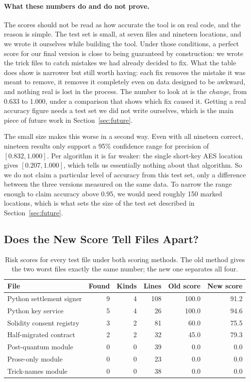\documentclass[runningheads]{llncs}
\begin{document}
\paragraph{What these numbers do and do not prove.} The scores should not be
read as how accurate the tool is on real code, and the reason is simple. The
test set is small, at seven files and nineteen locations, and we wrote it
ourselves while building the tool. Under those conditions, a perfect score for
our final version is close to being guaranteed by construction: we wrote the
trick files to catch mistakes we had already decided to fix. What the table does
show is narrower but still worth having: each fix removes the mistake it was
meant to remove, it removes it completely even on data designed to be awkward,
and nothing real is lost in the process. The number to look at is the
\emph{change}, from 0.633 to 1.000, under a comparison that shows which fix
caused it. Getting a real accuracy figure needs a test set we did not write
ourselves, which is the main piece of future work in Section~\ref{sec:future}.

The small size makes this worse in a second way. Even with all nineteen correct,
nineteen results only support a 95\% confidence range for precision of
$[0.832, 1.000]$. Per algorithm it is far weaker: the single short-key AES
location gives $[0.207, 1.000]$, which tells us essentially nothing about that
algorithm. So we do not claim a particular level of accuracy from this test set,
only a difference between the three versions measured on the same data. To
narrow the range enough to claim accuracy above 0.95, we would need roughly 150
marked locations, which is what sets the size of the test set described in
Section~\ref{sec:future}.

\subsection{Does the New Score Tell Files Apart?}

\begin{table}[t]
\centering
\caption{Risk scores for every test file under both scoring methods. The old
method gives the two worst files exactly the same number; the new one separates
all four.}
\label{tab:scores}
\begin{tabular}{@{}lrrrrr@{}}
\toprule
\textbf{File} & \textbf{Found} & \textbf{Kinds} & \textbf{Lines} &
\textbf{Old score} & \textbf{New score} \\
\midrule
Python settlement signer  & 9 & 4 & 108 & 100.0 & 91.2 \\
Python key service        & 5 & 4 &  26 & 100.0 & 94.6 \\
Solidity consent registry & 3 & 2 &  81 &  60.0 & 75.5 \\
Half-migrated contract    & 2 & 2 &  32 &  45.0 & 79.3 \\
Post-quantum module       & 0 & 0 &  39 &   0.0 &  0.0 \\
Prose-only module         & 0 & 0 &  23 &   0.0 &  0.0 \\
Trick-names module        & 0 & 0 &  38 &   0.0 &  0.0 \\
\bottomrule
\end{tabular}
\end{table}
\end{document}
